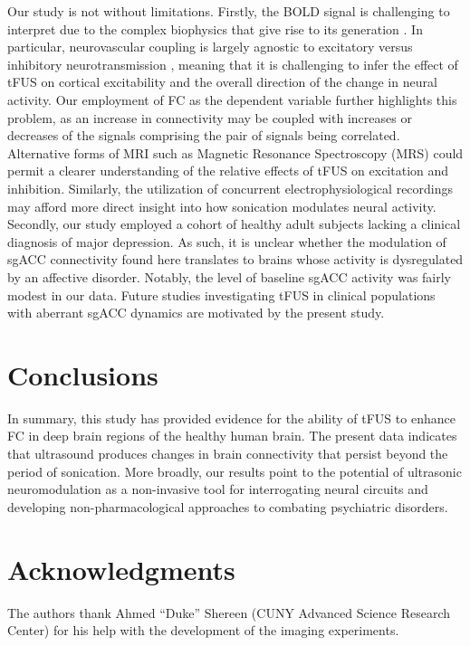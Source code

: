 \documentclass[conference]{ieeeconf}
\begin{document}

Our study is not without limitations. Firstly, the BOLD signal is challenging to interpret due to the complex biophysics that give rise to its generation \cite{buxton2013physics}. In particular, neurovascular coupling is largely agnostic to excitatory versus inhibitory neurotransmission \cite{logothetis2008we}, meaning that it is challenging to infer the effect of tFUS on cortical excitability and the overall direction of the change in neural activity. Our employment of FC as the dependent variable further highlights this problem, as an increase in connectivity may be coupled with increases or decreases of the signals comprising the pair of signals being correlated. Alternative forms of MRI such as Magnetic Resonance Spectroscopy (MRS) \cite{yaakub2023transcranial} could permit a clearer understanding of the relative effects of tFUS on excitation and inhibition. Similarly, the utilization of concurrent electrophysiological recordings \cite{kim2023transcranial,mueller2014transcranial,kim2022neuromodulation,lee2016transcranial,min2011focused} may afford more direct insight into how sonication modulates neural activity. Secondly, our study employed a cohort of healthy adult subjects lacking a clinical diagnosis of major depression. As such, it is unclear whether the modulation of sgACC connectivity found here translates to brains whose activity is dysregulated by an affective disorder. Notably, the level of baseline sgACC activity was fairly modest in our data. Future studies investigating tFUS in clinical populations with aberrant sgACC dynamics are motivated by the present study. 

\section*{Conclusions} \noindent
In summary, this study has provided evidence for the ability of tFUS to enhance FC in deep brain regions of the healthy human brain. The present data indicates that ultrasound produces changes in brain connectivity that persist beyond the period of sonication. More broadly, our results point to the potential of ultrasonic neuromodulation as a non-invasive tool for interrogating neural circuits and developing non-pharmacological approaches to combating psychiatric disorders.

\section{Acknowledgments} \noindent
The authors thank Ahmed ``Duke'' Shereen (CUNY Advanced Science Research Center) for his help with the development of the imaging experiments.




\end{document}
